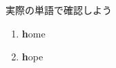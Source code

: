 \documentclass[aspectratio=169, xcolor={dvipsnames,table}]{beamer}
\begin{document}
\begin{frame}[plain]{実際の単語で確認しよう}
\begin{enumerate}
    \item \textcolor{NavyBlue}{\bfseries h}ome%
          \hfill
          \hspace{150pt}\mbox{}

    \item \textcolor{NavyBlue}{\bfseries h}ope%
          \hfill
          \hspace{150pt}\mbox{}

  \end{enumerate}
\end{frame}
\end{document}
